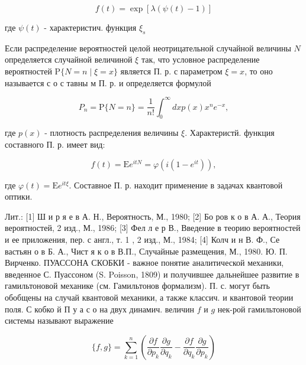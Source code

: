 \documentclass[10pt]{article}
\begin{document}
\[

f(t)=\exp [\lambda(\psi(t)-1)]

\]



где $\psi(t)$ - характеристич. функция $\xi_{s}$



Если распределение вероятностей целой неотрицательной случайной величины $N$ определяется случайной величиной $\xi$ так, что условное распределение вероятностей $\mathrm{P}\{N=n \mid \xi=x\}$ является П. р. с параметром $\xi=x$, то оно называется с о с тавны м П. р. и определяется формулой



\[

P_{n}=\mathrm{P}\{N=n\}=\frac{1}{n !} \int_{0}^{\infty} d x p(x) x^{n} e^{-x},

\]



где $p(x)$ - плотность распределения величины $\xi$. Характеристй. функция составного П. р. имеет вид:



\[

f(t)=\mathrm{E} e^{i t N}=\varphi\left(i\left(1-e^{i t}\right)\right),

\]



где $\varphi(t)=\mathrm{E} e^{i t \xi}$. Составное П. р. находит применение в задачах квантовой оптики.



Лит.: [1] Ш и р я е в А. Н., Вероятность, М., 1980; [2] Бо ров к о в А. А., Теория вероятностей, 2 изд., М., 1986; [3] Фел л е р В., Введение в теорию вероятностей и ее приложения, пер. с англ., т. 1 , 2 изд., М., 1984; [4] Колч и н В. Ф., Се вастьян о в Б. А., Чист я к о в В.П., Случайные размещения, М., 1980. Ю. П. Вирченко. ПУАССОНА СКОБКИ - важное понятие аналитической механики, введенное С. Пуассоном (S. Poisson, 1809) и получившее дальнейшее развитие в гамильтоновой механике (см. Гамильтонов формализм). П. с. могут быть обобщены на случай квантовой механики, а также классич. и квантовой теории поля. С кобко й П у а с о на двух динамич. величин $f$ и $g$ нек-рой гамильтоновой системы называют выражение



\[

\{f, g\}=\sum_{k=1}^{n}\left(\frac{\partial f}{\partial p_{k}} \frac{\partial g}{\partial q_{k}}-\frac{\partial f}{\partial q_{k}} \frac{\partial g}{\partial p_{k}}\right)

\]
\end{document}
